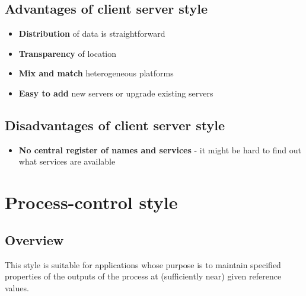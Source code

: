\documentclass[12pt]{book}
\begin{document}
\section{Advantages of client server style}

\begin{itemize}
    \item \textbf{Distribution} of data is straightforward
    \item \textbf{Transparency} of location
    \item \textbf{Mix and match} heterogeneous platforms
    \item \textbf{Easy to add} new servers or upgrade existing servers
\end{itemize}

\section{Disadvantages of client server style}

\begin{itemize}
    \item \textbf{No central register of names and services} - it might be hard to find out what services are available
\end{itemize}

\chapter{Process-control style}

\section{Overview}

This style is suitable for applications whose purpose is to maintain specified properties of the outputs of the process at (sufficiently near) given reference values.
\end{document}
